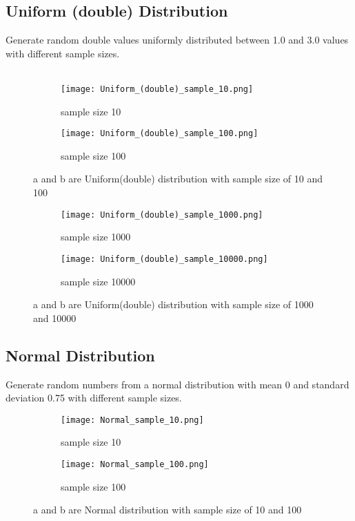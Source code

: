 \documentclass[12pt]{article}
\begin{document}
\subsection{Uniform (double) Distribution}
Generate random double values uniformly distributed between 1.0 and 3.0 values with different sample sizes.\\
\\
\begin{figure}[htb!]
    \centering
    \begin{subfigure}{0.45\textwidth}
        \centering
        \texttt{[image: Uniform\_(double)\_sample\_10.png]}
        \caption{sample size 10}
        \label{fig:sub1}
    \end{subfigure}
    \hfill
    \begin{subfigure}{0.45\textwidth}
        \centering
        \texttt{[image: Uniform\_(double)\_sample\_100.png]} 
        \caption{sample size 100}
        \label{fig:sub2}
    \end{subfigure}
    \caption{a and b are Uniform(double) distribution with sample size of 10 and 100}
    \label{fig:main}
\end{figure}

\begin{figure}[htb!]
    \centering
    \begin{subfigure}{0.45\textwidth}
        \centering
        \texttt{[image: Uniform\_(double)\_sample\_1000.png]}
        \caption{sample size 1000}
        \label{fig:sub1}
    \end{subfigure}
    \hfill
    \begin{subfigure}{0.45\textwidth}
        \centering
        \texttt{[image: Uniform\_(double)\_sample\_10000.png]} 
        \caption{sample size 10000}
        \label{fig:sub2}
    \end{subfigure}
    \caption{a and b are Uniform(double) distribution with sample size of 1000 and 10000}
    \label{fig:main}
\end{figure}

\subsection{Normal Distribution}
Generate random numbers from a normal distribution with mean 0 and standard deviation 0.75 with different sample sizes.\\

\begin{figure}[htb!]
    \centering
    \begin{subfigure}{0.45\textwidth}
        \centering
        \texttt{[image: Normal\_sample\_10.png]}
        \caption{sample size 10}
        \label{fig:sub1}
    \end{subfigure}
    \hfill
    \begin{subfigure}{0.45\textwidth}
        \centering
        \texttt{[image: Normal\_sample\_100.png]} 
        \caption{sample size 100}
        \label{fig:sub2}
    \end{subfigure}
    \caption{a and b are Normal distribution with sample size of 10 and 100}
    \label{fig:main}
\end{figure}
\end{document}
